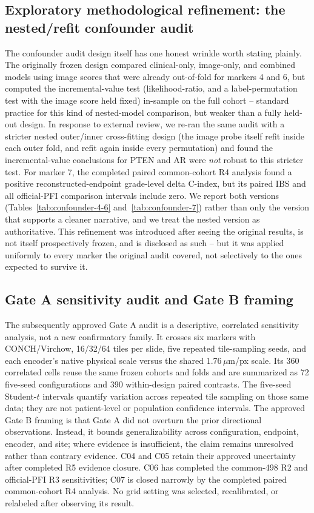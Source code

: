 \subsection{Exploratory methodological refinement: the nested/refit confounder audit}

The confounder audit design itself has one honest wrinkle worth stating plainly. The originally
frozen design compared clinical-only, image-only, and combined models using image scores that
were already out-of-fold for markers 4 and 6, but computed the incremental-value test
(likelihood-ratio, and a label-permutation test with the image score held fixed) in-sample on
the full cohort -- standard practice for this kind of nested-model comparison, but weaker than a
fully held-out design. In response to external review, we re-ran the same audit with a stricter
nested outer/inner cross-fitting design (the image probe itself refit inside each outer fold,
and refit again inside every permutation) and found the incremental-value conclusions for PTEN
and AR were \emph{not} robust to this stricter test. For marker 7, the completed paired
common-cohort R4 analysis found a positive reconstructed-endpoint grade-level delta C-index,
but its paired IBS and all official-PFI comparison intervals include zero.
We report both versions (Tables~\ref{tab:confounder-4-6} and~\ref{tab:confounder-7}) rather
than only the version that supports a cleaner narrative, and we treat the nested version as
authoritative. This refinement
was introduced after seeing the original results, is not itself prospectively frozen, and is
disclosed as such -- but it was applied uniformly to every marker the original audit covered,
not selectively to the ones expected to survive it.

\subsection{Gate A sensitivity audit and Gate B framing}

The subsequently approved Gate A audit is a descriptive, correlated sensitivity analysis,
not a new confirmatory family. It crosses six markers with CONCH/Virchow, 16/32/64 tiles per
slide, five repeated tile-sampling seeds, and each encoder's native physical scale versus the
shared $1.76\,\mu$m/px scale. Its 360 correlated cells reuse the same frozen cohorts and folds
and are summarized as 72 five-seed configurations and 390 within-design paired contrasts.
The five-seed Student-$t$ intervals quantify variation across repeated tile sampling on those
same data; they are not patient-level or population confidence intervals. The approved Gate B
framing is that Gate A did not overturn the prior directional observations. Instead, it bounds
generalizability across configuration, endpoint, encoder, and site; where evidence is
insufficient, the claim remains unresolved rather than contrary evidence. C04 and C05 retain
their approved uncertainty after completed R5 evidence closure. C06 has completed the
common-498 R2 and official-PFI R3 sensitivities; C07 is closed narrowly by the completed paired
common-cohort R4 analysis. No grid setting was selected, recalibrated, or
relabeled after observing its result.
